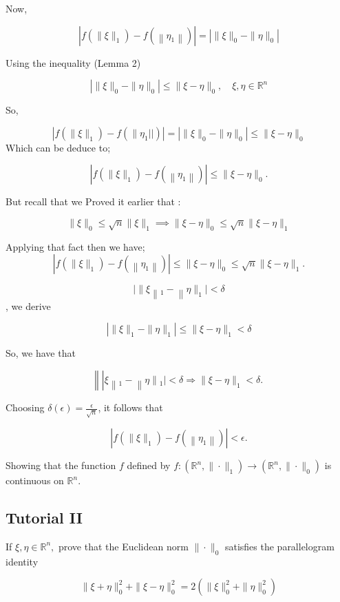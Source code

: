 \documentclass{article}
\begin{document}
Now,

$$
\left|f\left(\|\xi\|_{1}\right)-f\left(\left\|\eta_{1}\right\|\right)\right|=\left|\|\xi\|_{0}-\|\eta\|_{0}\right|
$$

Using the inequality  (Lemma 2)

$$
\left|\|\xi\|_{0}-\|\eta\|_{0}\right| \leq\|\xi-\eta\|_{0}, \quad \xi, \eta \in \mathbb{R}^{n}
$$

So, 

$$
\left|f\left(\|\xi\|_{1}\right)-f\left(\| \eta_{1}||\right)\right|=\left|\|\xi\|_{0}-\|\eta\|_{0}\right| \leq\|\xi-\eta\|_{0}
$$
Which can be deduce to;

$$
\left|f\left(\|\xi\|_{1}\right)-f\left(\left\|\eta_{1}\right\|\right)\right|\leq\|\xi-\eta\|_{0} .
$$

But recall that we Proved it earlier that :

$$\|\xi\|_{0} \leq \sqrt{n}\|\xi\|_{1} \implies  \|\xi-\eta\|_{0} \leq \sqrt{n}\|\xi-\eta\|_{1} $$

Applying that fact then we have;
$$
\left|f\left(\|\xi\|_{1}\right)-f\left(\left\|\eta_{1}\right\|\right)\right| \leq\|\xi-\eta\|_{0} \leq \sqrt{n}\|\xi-\eta\|_{1} .
$$

$$|\| \xi\left\|_{1}-\right\| \eta \|_{1} \mid<\delta$$, we derive

$$
\left|\|\xi\|_{1}-\|\eta\|_{1}\right| \leq\|\xi-\eta\|_{1}<\delta
$$

So, we have that

$$
\left\|\left|\xi\left\|_{1}-\right\| \eta\left\|_{1} \mid<\delta \Longrightarrow\right\| \xi-\eta \|_{1}<\delta\right.\right. \text {. }
$$

Choosing $\delta(\epsilon)=\frac{\epsilon}{\sqrt{n}}$, it follows that

$$
\left|f\left(\|\xi\|_{1}\right)-f\left(\left\|\eta_{1}\right\|\right)\right|<\epsilon .
$$

Showing that the function $f$ defined by $f:\left(\mathbb{R}^{n},\|\cdot\|_{1}\right) \longrightarrow\left(\mathbb{R}^{n},\|\cdot\|_{0}\right)$ is continuous on $\mathbb{R}^{n}$.

\subsection{Tutorial II}
\large{}
If $\xi,\eta \in \mathbb{R}^n,$
prove that the Euclidean norm $\|\cdot\|_{0}$ satisfies the parallelogram identity

$$
\|\xi+\eta\|_{0}^{2}+\|\xi-\eta\|_{0}^{2}=2\left(\|\xi\|_{0}^{2}+\|\eta\|_{0}^{2}\right)
$$
\end{document}
